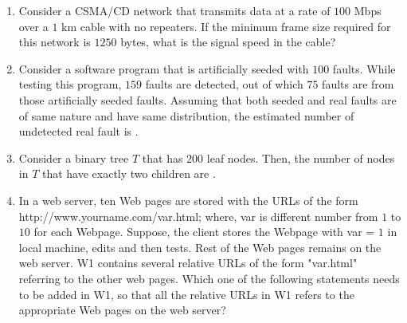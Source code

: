 \documentclass[journal,12pt,onecolumn]{IEEEtran}
\theoremstyle{remark}
\begin{document}
\begin{enumerate}
		\item Consider a CSMA/CD network that transmits data at a rate of $100$ Mbps  over a $1$ km cable with no repeaters. If the minimum frame size required for this network is $1250$ bytes, what is the signal speed  in the cable?
		
		\hfill{}
		
		\begin{enumerate}
		\end{enumerate}
		
		\item Consider a software program that is artificially seeded with $100$ faults. While testing this program, $159$ faults are detected, out of which $75$ faults are from those artificially seeded faults. Assuming that both seeded and real faults are of same nature and have same distribution, the estimated number of undetected real fault is \underline{\hspace{2cm}}.
		
		\hfill{}
		
		\item Consider a binary tree $T$ that has $200$ leaf nodes. Then, the number of nodes in $T$ that have exactly two children are \underline{\hspace{2cm}}.
		
		\hfill{}
		
		\item In a web server, ten Web pages are stored with the URLs of the form http://www.yourname.com/var.html; where, var is different number from $1$ to $10$ for each Webpage. Suppose, the client stores the Webpage with var = $1$ in local machine, edits and then tests. Rest of the Web pages remains on the web server. W1 contains several relative URLs of the form "var.html" referring to the other web pages. Which one of the following statements needs to be added in W1, so that all the relative URLs in W1 refers to the appropriate Web pages on the web server?
		
		\hfill{}
		

\end{enumerate}
\end{document}
